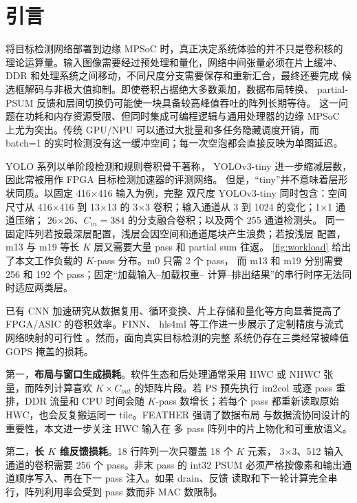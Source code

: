 \section{引言}
\label{sec:intro}

将目标检测网络部署到边缘 MPSoC 时，真正决定系统体验的并不只是卷积核的
理论运算量。输入图像需要经过预处理和量化，网络中间张量必须在片上缓冲、
DDR 和处理系统之间移动，不同尺度分支需要保存和重新汇合，最终还要完成
候选框解码与非极大值抑制。即使卷积占据绝大多数乘加，数据布局转换、
partial-PSUM 反馈和层间切换仍可能使一块具备较高峰值吞吐的阵列长期等待。
这一问题在功耗和内存资源受限、但同时集成可编程逻辑与通用处理器的边缘
MPSoC 上尤为突出。传统 GPU/NPU 可以通过大批量和多任务隐藏调度开销，而
batch=1 的实时检测没有这一缓冲空间；每一次空泡都会直接反映为单图延迟。

YOLO 系列以单阶段检测和规则卷积骨干著称\cite{yolov1,yolov2,yolov3}，
YOLOv3-tiny 进一步缩减层数，因此常被用作 FPGA 目标检测加速器的评测网络。
但是，“tiny”并不意味着层形状同质。以固定 416$\times$416 输入为例，完整
双尺度 YOLOv3-tiny 同时包含：空间尺寸从 416$\times$416 到 13$\times$13
的 3$\times$3 卷积；输入通道从 3 到 1024 的变化；1$\times$1 通道压缩；
26$\times$26、$C_{in}=384$ 的分支融合卷积；以及两个 255 通道检测头。
同一固定阵列若按最深层配置，浅层会因空间和通道尾块产生浪费；若按浅层
配置，m13 与 m19 等长 $K$ 层又需要大量 pass 和 partial sum 往返。
\cref{fig:workload} 给出了本文工作负载的 $K$-pass 分布。m0 只需 2 个 pass，
而 m13 和 m19 分别需要 256 和 192 个 pass；固定“加载输入--加载权重--
计算--排出结果”的串行时序无法同时适应两类层。



已有 CNN 加速研究从数据复用、循环变换、片上存储和量化等方向显著提高了
FPGA/ASIC 的卷积效率\cite{kung1982systolic,zhang2015optimizing,
qiu2016going,caffeine2016,chen2016eyeriss,chen2017eyerissv2}。FINN、
hls4ml 等工作进一步展示了定制精度与流式网络映射的可行性
\cite{finn2017,umuroglu2020finn,hls4ml2018}。然而，面向真实目标检测的完整
系统仍存在三类经常被峰值 GOPS 掩盖的损耗。

第一，\textbf{布局与窗口生成损耗}。软件生态和后处理通常采用 HWC 或
NHWC 张量，而阵列计算喜欢 $K\times C_{out}$ 的矩阵片段。若 PS 预先执行
im2col 或逐 pass 重排，DDR 流量和 CPU 时间会随 $K$-pass 数增长；若每个
pass 都重新读取原始 HWC，也会反复搬运同一 tile。FEATHER 强调了数据布局
与数据流协同设计的重要性\cite{feather2024}，本文进一步关注 HWC 输入在
多 pass 阵列中的片上物化和可重放语义。

第二，\textbf{长 $K$ 维反馈损耗}。18 行阵列一次只覆盖 18 个 $K$ 元素，
3$\times$3、512 输入通道的卷积需要 256 个 pass。非末 pass 的 int32 PSUM
必须严格按像素和输出通道顺序写入、再在下一 pass 注入。如果 drain、反馈
读取和下一轮计算完全串行，阵列利用率会受到 pass 数而非 MAC 数限制。

